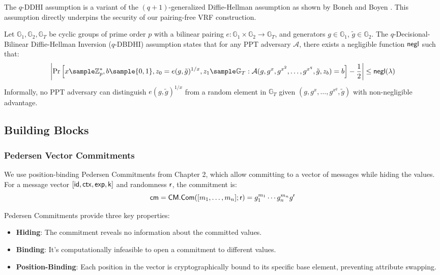 \begin{remark}
The $q$-DDHI assumption is a variant of the $(q+1)$-generalized Diffie-Hellman assumption as shown by Boneh and Boyen \cite{kanade_efficient_2004}. This assumption directly underpins the security of our pairing-free VRF construction.
\end{remark}

\begin{definition}
Let $\mathbb{G}_1, \mathbb{G}_2, \mathbb{G}_T$ be cyclic groups of prime order $p$ with a bilinear pairing $e: \mathbb{G}_1 \times \mathbb{G}_2 \to \mathbb{G}_T$, and generators $g \in \mathbb{G}_1$, $\tilde{g} \in \mathbb{G}_2$. The $q$-Decisional-Bilinear Diffie-Hellman Inversion ($q$-DBDHI) assumption states that for any PPT adversary $\mathcal{A}$, there exists a negligible function $\mathsf{negl}$ such that:
\[
\left| \Pr\left[ x \sample \Z_p^*, b \sample \{0,1\}, z_0 = e(g, \tilde{g})^{1/x}, z_1 \sample \G_T : \mathcal{A}(g, g^x, g^{x^2}, \ldots, g^{x^q}, \tilde{g}, z_b) = b \right] - \frac{1}{2}\right| \leq \negl(\lambda)
\]
Informally, no PPT adversary can distinguish $e(g, \tilde{g})^{1/x}$ from a random element in $\mathbb{G}_T$ given $(g, g^x, \ldots, g^{x^q}, \tilde{g})$ with non-negligible advantage.
\end{definition}


\subsection{Building Blocks}

\subsubsection{Pedersen Vector Commitments}
We use position-binding Pedersen Commitments from Chapter 2, which allow committing to a vector of messages while hiding the values. For a message vector $[\mathsf{id}, \mathsf{ctx}, \mathsf{exp}, \mathsf{k}]$ and randomness $\mathsf{r}$, the commitment is:
\[
\mathsf{cm} = \mathsf{CM.Com}([m_1, \ldots, m_n];\mathsf{r}) = g_1^{m_1} \cdots g_n^{m_n} g^{\mathsf{r}}
\]

Pedersen Commitments provide three key properties:
\begin{itemize}
    \item \textbf{Hiding}: The commitment reveals no information about the committed values.
    \item \textbf{Binding}: It's computationally infeasible to open a commitment to different values.
    \item \textbf{Position-Binding}: Each position in the vector is cryptographically bound to its specific base element, preventing attribute swapping.
\end{itemize}


